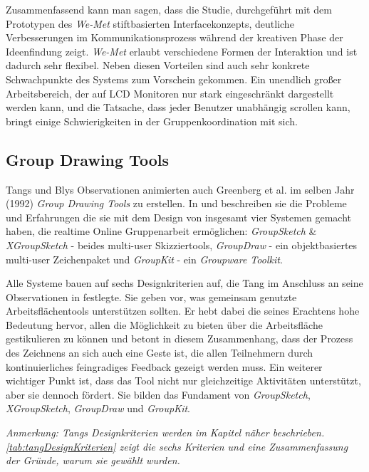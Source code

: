 \medskip Zusammenfassend kann man sagen, dass die Studie, durchgeführt mit dem Prototypen des \emph{We-Met} stiftbasierten Interfacekonzepts, deutliche Verbesserungen im Kommunikationsprozess während der kreativen Phase der Ideenfindung zeigt. \emph{We-Met} erlaubt verschiedene Formen der Interaktion und ist dadurch sehr flexibel. Neben diesen Vorteilen sind auch sehr konkrete Schwachpunkte des Systems zum Vorschein gekommen. Ein unendlich großer Arbeitsbereich, der auf LCD Monitoren nur stark eingeschränkt dargestellt werden kann, und die Tatsache, dass jeder Benutzer unabhängig scrollen kann, bringt einige Schwierigkeiten in der Gruppenkoordination mit sich.

\newpage
\subsection{Group Drawing Tools} 
Tangs und Blys Observationen animierten auch Greenberg et al. im selben Jahr (1992) \emph{Group Drawing Tools} zu erstellen. In \citep{Greenberg:1992p207} und \citep{Greenberg:1992p83} beschreiben sie die Probleme und Erfahrungen die sie mit dem Design von insgesamt vier Systemen gemacht haben, die realtime Online Gruppenarbeit ermöglichen: \emph{GroupSketch} \& \emph{XGroupSketch} - beides multi-user Skizziertools, \emph{GroupDraw} - ein objektbasiertes multi-user Zeichenpaket und \emph{GroupKit} - ein \emph{Groupware Toolkit}.

\medskip Alle Systeme bauen auf sechs Designkriterien auf, die Tang im Anschluss an seine Observationen in \citep{TangJC:1989} festlegte. Sie geben vor, was gemeinsam genutzte Arbeitsflächentools unterstützen sollten. Er hebt dabei die seines Erachtens hohe Bedeutung hervor, allen die Möglichkeit zu bieten über die Arbeitsfläche gestikulieren zu können und betont in diesem Zusammenhang, dass der Prozess des Zeichnens an sich auch eine Geste ist, die allen Teilnehmern durch kontinuierliches feingradiges Feedback gezeigt werden muss. Ein weiterer wichtiger Punkt ist, dass das Tool nicht nur gleichzeitige Aktivitäten unterstützt, aber sie dennoch fördert.  Sie bilden das Fundament von \emph{GroupSketch}, \emph{XGroupSketch}, \emph{GroupDraw} und \emph{GroupKit}.

\medskip \emph{Anmerkung: \graffito{\(\clubsuit\)} Tangs Designkriterien werden im Kapitel  näher beschrieben. \autoref{tab:tangDesignKriterien} zeigt die sechs Kriterien und eine Zusammenfassung der Gründe, warum sie gewählt wurden.}

